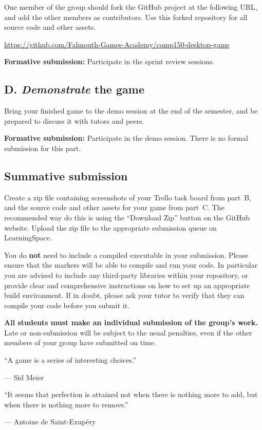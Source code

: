 \documentclass{../fal_assignment}
\begin{document}
One member of the group should fork the GitHub project at the following URL, and add the other members as contributors.
Use this forked repository for all source code and other assets.
\begin{center}
\url{https://github.com/Falmouth-Games-Academy/comp150-desktop-game}
\end{center}

\textbf{Formative submission:} Participate in the sprint review sessions.

\subsection*{D. \emph{Demonstrate} the game}

Bring your finished game to the demo session at the end of the semester,
and be prepared to discuss it with tutors and peers.

\textbf{Formative submission:} Participate in the demo session.
    There is no formal submission for this part.

\subsection*{Summative submission}

Create a zip file containing screenshots of your Trello task board from part~B,
and the source code and other assets for your game from part~C.
The recommended way do this is using the ``Download Zip'' button on the GitHub website.
Upload the zip file to the appropriate submission queue on LearningSpace.

You do \textbf{not} need to include a compiled executable in your submission.
Please ensure that the markers will be able to compile and run your code.
In particular you are advised to include any third-party libraries within your repository,
or provide clear and comprehensive instructions on how to set up an appropriate build environment.
If in doubt, please ask your tutor to verify that they can compile your code before you submit it.

\textbf{All students must make an individual submission of the group's work.}
Late or non-submission will be subject to the usual penalties,
even if the other members of your group have submitted on time.

\begin{marginquote}
    ``A game is a series of interesting choices.''
    
    --- Sid Meier
    
    \marginquoterule
    
    ``It seems that perfection is attained not when there is nothing more to add,
        but when there is nothing more to remove.''
    
    --- Antoine de Saint-Exup\'ery
\end{marginquote}
\end{document}
